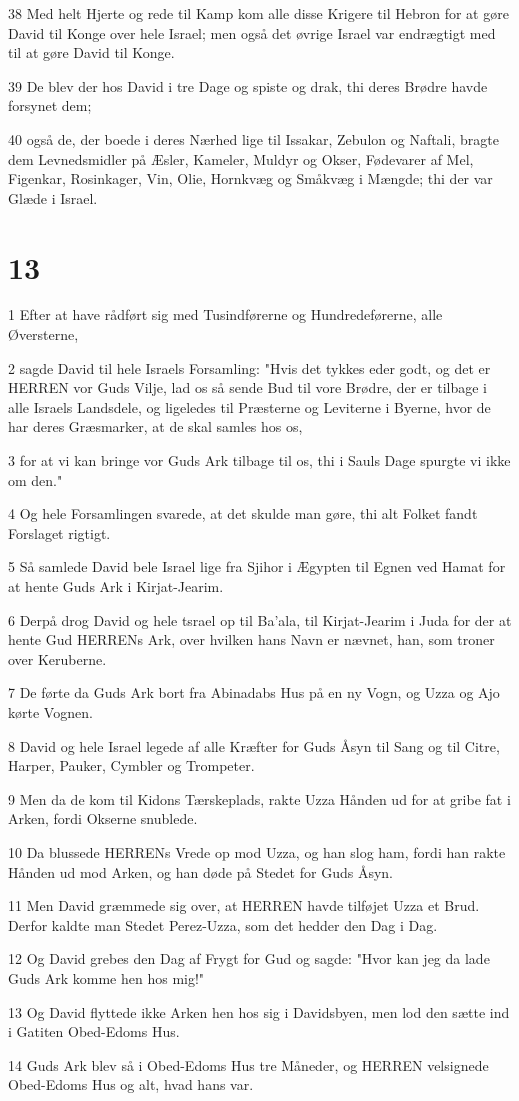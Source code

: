 \par 38 Med helt Hjerte og rede til Kamp kom alle disse Krigere til Hebron for at gøre David til Konge over hele Israel; men også det øvrige Israel var endrægtigt med til at gøre David til Konge.
\par 39 De blev der hos David i tre Dage og spiste og drak, thi deres Brødre havde forsynet dem;
\par 40 også de, der boede i deres Nærhed lige til Issakar, Zebulon og Naftali, bragte dem Levnedsmidler på Æsler, Kameler, Muldyr og Okser, Fødevarer af Mel, Figenkar, Rosinkager, Vin, Olie, Hornkvæg og Småkvæg i Mængde; thi der var Glæde i Israel.

\chapter{13}

\par 1 Efter at have rådført sig med Tusindførerne og Hundredeførerne, alle Øversterne,
\par 2 sagde David til hele Israels Forsamling: "Hvis det tykkes eder godt, og det er HERREN vor Guds Vilje, lad os så sende Bud til vore Brødre, der er tilbage i alle Israels Landsdele, og ligeledes til Præsterne og Leviterne i Byerne, hvor de har deres Græsmarker, at de skal samles hos os,
\par 3 for at vi kan bringe vor Guds Ark tilbage til os, thi i Sauls Dage spurgte vi ikke om den."
\par 4 Og hele Forsamlingen svarede, at det skulde man gøre, thi alt Folket fandt Forslaget rigtigt.
\par 5 Så samlede David bele Israel lige fra Sjihor i Ægypten til Egnen ved Hamat for at hente Guds Ark i Kirjat-Jearim.
\par 6 Derpå drog David og hele tsrael op til Ba'ala, til Kirjat-Jearim i Juda for der at hente Gud HERRENs Ark, over hvilken hans Navn er nævnet, han, som troner over Keruberne.
\par 7 De førte da Guds Ark bort fra Abinadabs Hus på en ny Vogn, og Uzza og Ajo kørte Vognen.
\par 8 David og hele Israel legede af alle Kræfter for Guds Åsyn til Sang og til Citre, Harper, Pauker, Cymbler og Trompeter.
\par 9 Men da de kom til Kidons Tærskeplads, rakte Uzza Hånden ud for at gribe fat i Arken, fordi Okserne snublede.
\par 10 Da blussede HERRENs Vrede op mod Uzza, og han slog ham, fordi han rakte Hånden ud mod Arken, og han døde på Stedet for Guds Åsyn.
\par 11 Men David græmmede sig over, at HERREN havde tilføjet Uzza et Brud. Derfor kaldte man Stedet Perez-Uzza, som det hedder den Dag i Dag.
\par 12 Og David grebes den Dag af Frygt for Gud og sagde: "Hvor kan jeg da lade Guds Ark komme hen hos mig!"
\par 13 Og David flyttede ikke Arken hen hos sig i Davidsbyen, men lod den sætte ind i Gatiten Obed-Edoms Hus.
\par 14 Guds Ark blev så i Obed-Edoms Hus tre Måneder, og HERREN velsignede Obed-Edoms Hus og alt, hvad hans var.

